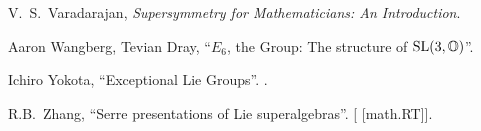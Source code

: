 \begin{thebibliography}{99}
V.~S.~Varadarajan,
\textit{Supersymmetry for Mathematicians: An Introduction}.

Aaron Wangberg, Tevian Dray,
``$E_{6}$, the Group: The structure of $\operatorname{SL}(3,\mathbb{O})$''.

Ichiro Yokota,
``Exceptional Lie Groups''.
.
  
R.B.~Zhang,
``Serre presentations of Lie superalgebras''.
[ [math.RT]].

\end{thebibliography}



